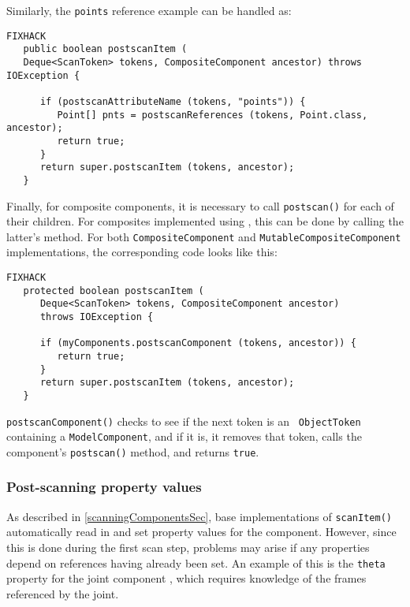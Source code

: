 \documentclass{article}
\begin{document}
Similarly, the {\tt points} reference example can be handled as:
\begin{lstlisting}FIXHACK
   public boolean postscanItem (
   Deque<ScanToken> tokens, CompositeComponent ancestor) throws IOException {

      if (postscanAttributeName (tokens, "points")) {
         Point[] pnts = postscanReferences (tokens, Point.class, ancestor);
         return true;
      }
      return super.postscanItem (tokens, ancestor);
   }
\end{lstlisting}

Finally, for composite components, it is necessary to call {\tt postscan()} for
each of their children. For composites implemented using
,
this can be done by calling the latter's
method. For both 
{\tt CompositeComponent} and {\tt MutableCompositeComponent}
implementations, the corresponding code looks like this:
\begin{lstlisting}FIXHACK
   protected boolean postscanItem (
      Deque<ScanToken> tokens, CompositeComponent ancestor) 
      throws IOException {
      
      if (myComponents.postscanComponent (tokens, ancestor)) {
         return true;
      }
      return super.postscanItem (tokens, ancestor);
   }
\end{lstlisting}
{\tt postscanComponent()} checks to see if the next token is an {\tt
ObjectToken} containing a {\tt ModelComponent}, and if it is, it
removes that token, calls the component's {\tt postscan()} method, and
returns {\tt true}.

\subsubsection{Post-scanning property values}

As described in \ref{scanningComponentsSec}, base implementations of
{\tt scanItem()} automatically read in and set property values for the
component. However, since this is done during the first scan step,
problems may arise if any properties depend on references having
already been set. An example of this is the {\tt theta} property for
the joint component
, which requires
knowledge of the frames referenced by the joint.
\end{document}
